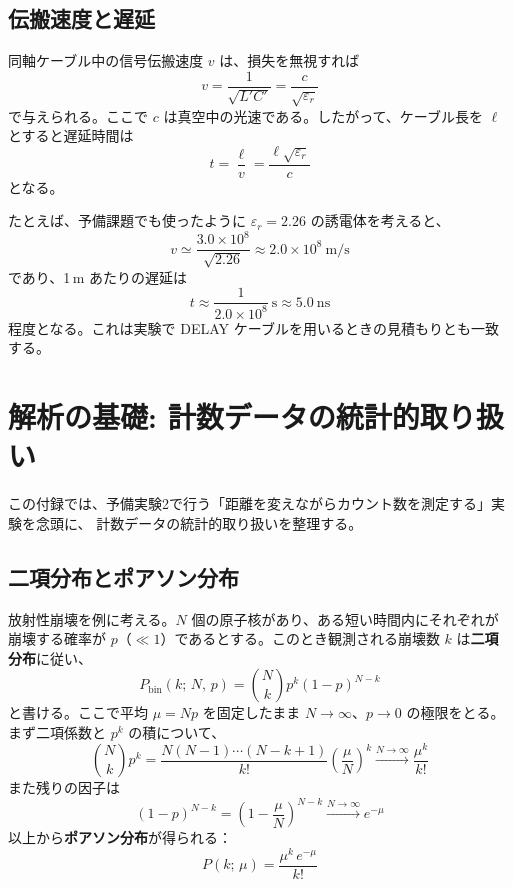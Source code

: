 \documentclass[uplatex,dvipdfmx,12pt,nomag]{jsarticle}
\begin{document}
\subsection{伝搬速度と遅延}

同軸ケーブル中の信号伝搬速度 $v$ は、損失を無視すれば
\begin{equation}
  v = \frac{1}{\sqrt{L'C'}} = \frac{c}{\sqrt{\varepsilon_r}}
\end{equation}
で与えられる。ここで $c$ は真空中の光速である。したがって、ケーブル長を $\ell$ とすると遅延時間は
\begin{equation}
  t = \frac{\ell}{v} = \frac{\ell\sqrt{\varepsilon_r}}{c}
\end{equation}
となる。

たとえば、予備課題でも使ったように $\varepsilon_r=2.26$ の誘電体を考えると、
\begin{equation}
  v \simeq \frac{3.0\times10^8}{\sqrt{2.26}}
  \approx 2.0\times10^8\ \mathrm{m/s}
\end{equation}
であり、1\,m あたりの遅延は
\begin{equation}
  t \approx \frac{1}{2.0\times10^8}\ \mathrm{s}
  \approx 5.0\ \mathrm{ns}
\end{equation}
程度となる。これは実験で DELAY ケーブルを用いるときの見積もりとも一致する。


\clearpage
\section{解析の基礎: 計数データの統計的取り扱い}

この付録では、予備実験2で行う「距離を変えながらカウント数を測定する」実験を念頭に、
計数データの統計的取り扱いを整理する。

\subsection{二項分布とポアソン分布}

放射性崩壊を例に考える。$N$ 個の原子核があり、ある短い時間内にそれぞれが崩壊する確率が
$p$（$\ll 1$）であるとする。このとき観測される崩壊数 $k$ は\textbf{二項分布}に従い、
\begin{equation}
  P_{\mathrm{bin}}(k;\, N,\, p)
  = \binom{N}{k} p^k (1-p)^{N-k}
\end{equation}
と書ける。ここで平均 $\mu = Np$ を固定したまま $N \to \infty$、$p \to 0$ の極限をとる。
まず二項係数と $p^k$ の積について、
\begin{equation}
  \binom{N}{k} p^k
  = \frac{N(N-1)\cdots(N-k+1)}{k!}
    \left(\frac{\mu}{N}\right)^k
  \xrightarrow{N\to\infty} \frac{\mu^k}{k!}
\end{equation}
また残りの因子は
\begin{equation}
  (1-p)^{N-k}
  = \left(1 - \frac{\mu}{N}\right)^{N-k}
  \xrightarrow{N\to\infty} e^{-\mu}
\end{equation}
以上から\textbf{ポアソン分布}が得られる：
\begin{equation}
  P(k;\, \mu) = \frac{\mu^k\, e^{-\mu}}{k!}
  \label{eq:poisson}
\end{equation}
\end{document}
